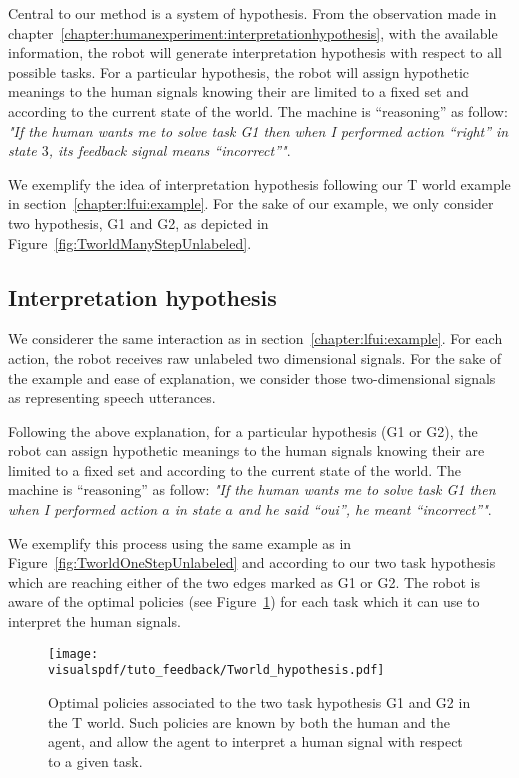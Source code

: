Central to our method is a system of hypothesis. From the observation made in chapter~\ref{chapter:humanexperiment:interpretationhypothesis}, with the available information, the robot will generate interpretation hypothesis with respect to all possible tasks. For a particular hypothesis, the robot will assign hypothetic meanings to the human signals knowing their are limited to a fixed set and according to the current state of the world. The machine is ``reasoning'' as follow: \emph{"If the human wants me to solve task G1 then when I performed action ``right'' in state $3$, its feedback signal means ``incorrect''"}. 

We exemplify the idea of interpretation hypothesis following our T world example in section~\ref{chapter:lfui:example}. For the sake of our example, we only consider two hypothesis, G1 and G2, as depicted in Figure~\ref{fig:TworldManyStepUnlabeled}.

\subsection{Interpretation hypothesis}
\label{chapter:lfui:interpreation}

We considerer the same interaction as in section~\ref{chapter:lfui:example}. For each action, the robot receives raw unlabeled two dimensional signals. For the sake of the example and ease of explanation, we consider those two-dimensional signals as representing speech utterances.

Following the above explanation, for a particular hypothesis (G1 or G2), the robot can assign hypothetic meanings to the human signals knowing their are limited to a fixed set and according to the current state of the world. The machine is ``reasoning'' as follow: \emph{"If the human wants me to solve task G1 then when I performed action $a$ in state $a$ and he said ``oui'', he meant ``incorrect''"}. 

We exemplify this process using the same example as in Figure~\ref{fig:TworldOneStepUnlabeled} and according to our two task hypothesis which are reaching either of the two edges marked as G1 or G2. The robot is aware of the optimal policies (see Figure~\ref{fig:Twolrdpolicies}) for each task which it can use to interpret the human signals.

\begin{figure}[!htbp]
  \centering
  \texttt{[image: \\visualspdf/tuto\_feedback/Tworld\_hypothesis.pdf]}
  \caption{Optimal policies associated to the two task hypothesis G1 and G2 in the T world. Such policies are known by both the human and the agent, and allow the agent to interpret a human signal with respect to a given task.}
  \label{fig:Twolrdpolicies}
\end{figure}

